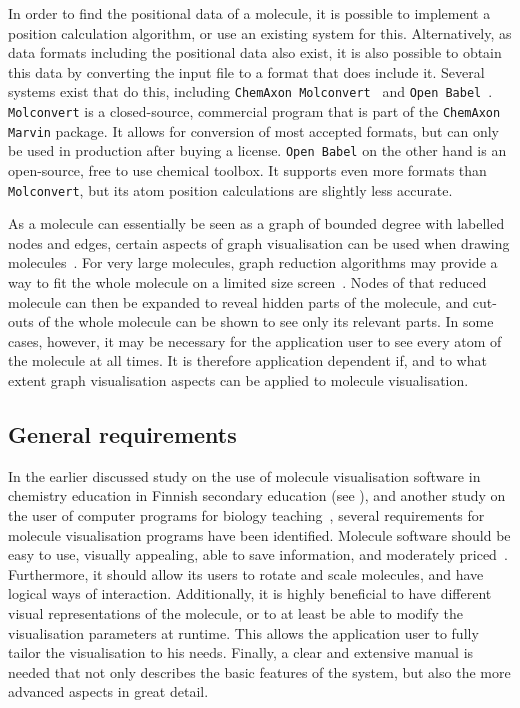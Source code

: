 In order to find the positional data of a molecule, it is possible to implement a position calculation algorithm, or use an existing system for this. Alternatively, as data formats including the positional data also exist, it is also possible to obtain this data by converting the input file to a format that does include it. Several systems exist that do this, including \verb|ChemAxon Molconvert|~\cite{chemaxon2014molecule} and \verb|Open Babel|~\cite{oboyle2011open}. \verb|Molconvert| is a closed-source, commercial program that is part of the \verb|ChemAxon Marvin| package. It allows for conversion of most accepted formats, but can only be used in production after buying a license. \verb|Open Babel| on the other hand is an open-source, free to use chemical toolbox. It supports even more formats than \verb|Molconvert|, but its atom position calculations are slightly less accurate.

As a molecule can essentially be seen as a graph of bounded degree with labelled nodes and edges, certain aspects of graph visualisation can be used when drawing molecules~\cite{boissonnat2001structure}. For very large molecules, graph reduction algorithms may provide a way to fit the whole molecule on a limited size screen~\cite{batagelj2004pajek}. Nodes of that reduced molecule can then be expanded to reveal hidden parts of the molecule, and cut-outs of the whole molecule can be shown to see only its relevant parts. In some cases, however, it may be necessary for the application user to see every atom of the molecule at all times. It is therefore application dependent if, and to what extent graph visualisation aspects can be applied to molecule visualisation.

\subsection{General requirements}
In the earlier discussed study on the use of molecule visualisation software in chemistry education in Finnish secondary education (see ), and another study on the user of computer programs for biology teaching~\cite{taylor2013interface}, several requirements for molecule visualisation programs have been identified. Molecule software should be easy to use, visually appealing, able to save information, and moderately priced~\cite{aksela2008computer}. Furthermore, it should allow its users to rotate and scale molecules, and have logical ways of interaction. Additionally, it is highly beneficial to have different visual representations of the molecule, or to at least be able to modify the visualisation parameters at runtime. This allows the application user to fully tailor the visualisation to his needs. Finally, a clear and extensive manual is needed that not only describes the basic features of the system, but also the more advanced aspects in great detail.


